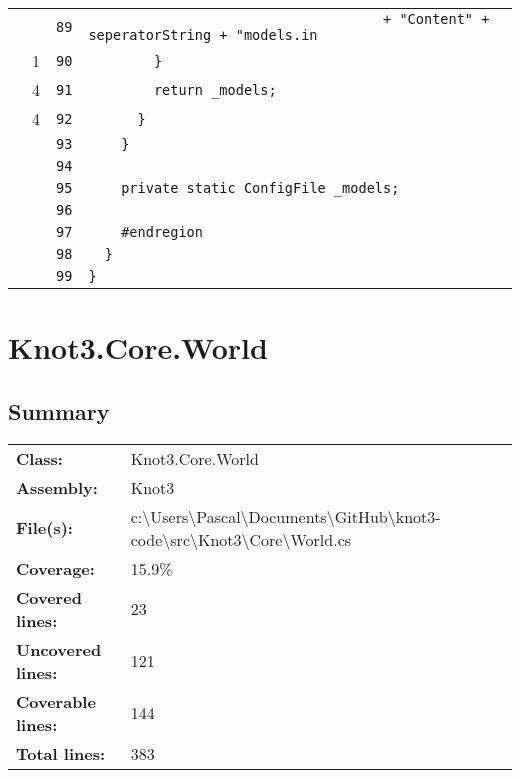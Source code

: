 \documentclass[a4paper,10pt]{article}
\begin{document}
\begin{longtable}[l]{lrrl}
\cellcolor{gray} &  & \verb~89~ & \verb~                                    + "Content" + seperatorString + "models.in~\\
\cellcolor{green} & 1 & \verb~90~ & \verb~        }~\\
\cellcolor{green} & 4 & \verb~91~ & \verb~        return _models;~\\
\cellcolor{green} & 4 & \verb~92~ & \verb~      }~\\
\cellcolor{gray} &  & \verb~93~ & \verb~    }~\\
\cellcolor{gray} &  & \verb~94~ & \verb~~\\
\cellcolor{gray} &  & \verb~95~ & \verb~    private static ConfigFile _models;~\\
\cellcolor{gray} &  & \verb~96~ & \verb~~\\
\cellcolor{gray} &  & \verb~97~ & \verb~    #endregion~\\
\cellcolor{gray} &  & \verb~98~ & \verb~  }~\\
\cellcolor{gray} &  & \verb~99~ & \verb~}~\\
\end{longtable}
\newpage
\section{Knot3.Core.World}
\subsection{Summary}
\begin{longtable}[l]{ll}
\textbf{Class:} & Knot3.Core.World\\
\textbf{Assembly:} & Knot3\\
\textbf{File(s):} & \begin{minipage}[t]{12cm}{c:\textbackslash Users\textbackslash Pascal\textbackslash Documents\textbackslash GitHub\textbackslash knot3-code\textbackslash src\textbackslash Knot3\textbackslash Core\textbackslash World.cs}\end{minipage} \\
\textbf{Coverage:} & 15.9\%\\
\textbf{Covered lines:} & 23\\
\textbf{Uncovered lines:} & 121\\
\textbf{Coverable lines:} & 144\\
\textbf{Total lines:} & 383\\
\end{longtable}
\end{document}
